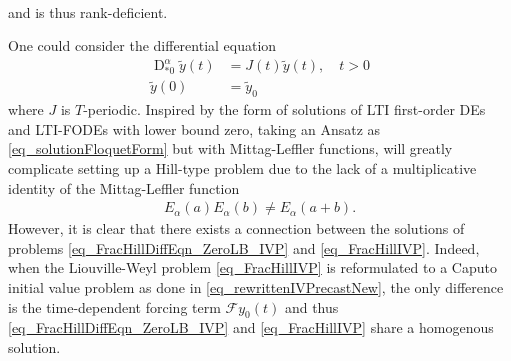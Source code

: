 \documentclass{svproc}
\newcommand{\AstderivativeInput}[2]{\operatorname{D}_{\ast #2}^{#1}}
\begin{document}
{\begin{remark}
\begin{align}
		\end{align}
		and is thus rank-deficient.
	\end{remark}
{%
	\begin{remark}
		{ One could consider the differential equation\begin{subequations}\label{eq_FracHillDiffEqn_ZeroLB_IVP}
				\begin{align}\label{eq_FracHillDiffEqn_ZeroLB}
					\AstderivativeInput{\alpha}{0} \tilde y(t) &= J(t) \tilde y(t), \quad t >0\\
					\tilde y(0) &= \tilde y_0
				\end{align}
			\end{subequations} where $J$ is $T$-periodic. Inspired by the form of solutions of LTI first-order DEs and LTI-FODEs with lower bound zero, taking an Ansatz as \eqref{eq_solutionFloquetForm} but with Mittag-Leffler functions, will greatly complicate setting up a Hill-type problem due to the lack of a multiplicative identity of the Mittag-Leffler function \cite{Diethelm2010}
			\begin{align}
				E_\alpha(a)E_\alpha(b)\neq E_\alpha(a+b).
		\end{align}
	However, it is clear that there exists a connection between the solutions of problems \eqref{eq_FracHillDiffEqn_ZeroLB_IVP} and \eqref{eq_FracHillIVP}. Indeed, when the Liouville-Weyl problem \eqref{eq_FracHillIVP} is reformulated to a Caputo initial value problem as done in \eqref{eq_rewrittenIVPrecastNew}, the only difference is the time-dependent forcing term $\mathcal Fy_0(t)$ and thus \eqref{eq_FracHillDiffEqn_ZeroLB_IVP} and \eqref{eq_FracHillIVP} share a homogenous solution.}
	\end{remark}}
	
}
\end{document}
